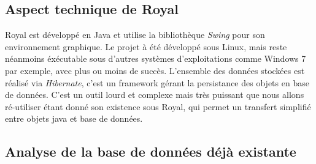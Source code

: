 \subsection{Aspect technique de Royal}
Royal est développé en Java et utilise la bibliothèque \emph{Swing} pour son environnement graphique. 
Le projet à été développé sous Linux, mais reste néanmoins éxécutable sous d'autres systèmes d'exploitations comme Windows 7 par exemple, avec plus ou moins de succès. 
L'ensemble des données stockées est réalisé via \emph{Hibernate}, c'est un framework gérant la persistance des objets en base de données. 
C'est un outil lourd et complexe mais très puissant que nous allons ré-utiliser étant donné son existence sous Royal, qui permet un transfert simplifié entre objets java et base de données.

\subsection{Analyse de la base de données déjà existante}
